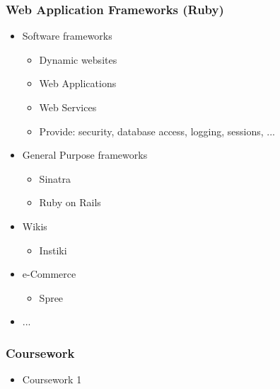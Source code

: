 \documentclass{beamer}
\begin{document}
\begin{frame}\frametitle{Web Application Frameworks (Ruby)} 
  \begin{itemize}

    \item Software frameworks
    \begin{itemize}
      \item Dynamic websites
      \item Web Applications
      \item Web Services
      \item Provide: security, database access, logging, sessions, ...
    \end{itemize}     
    \pause
    
    \item General Purpose frameworks 
    \begin{itemize}
      \item Sinatra
      \item Ruby on Rails
    \end{itemize}     
    \pause
    
    \item Wikis
    \begin{itemize}
      \item Instiki
    \end{itemize}     
    \pause

    
    \item e-Commerce
    \begin{itemize}
      \item Spree
    \end{itemize}   
    
    \item ...

  \end{itemize}
\end{frame}


\begin{frame}\frametitle{Coursework} 
  \begin{itemize}
    \item Coursework 1
  \end{itemize}
\end{frame}
\end{document}
